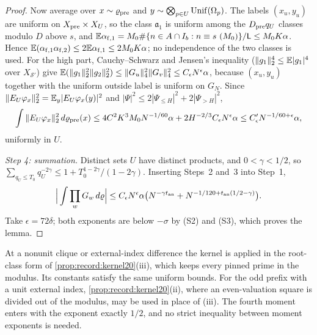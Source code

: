 \begin{proof}
Now average over $x\sim\varrho_{\rm pre}$ and
$y\sim\bigotimes_{p\in U}\operatorname{Unif}(\Omega_{p})$. The labels $(x_u,y_u)$ are uniform on
$X_{\rm pre}\times X_U$, so the class $\mathfrak a_1$ is uniform among the
$D_{\rm pre}q_U$ classes modulo $D$ above $s$, and
$\mathbb E\alpha_{{\rm f},1}=M_0\#\{n\in A\cap I_b:n\equiv s\ (M_0)\}/\mathsf L
\le M_0K\alpha$. Hence
$\mathbb E(\alpha_{{\rm f},1}\alpha_{{\rm f},2})\le2\mathbb E\alpha_{{\rm f},1}\le2M_0K\alpha$;
no independence of the two classes is used. For the high part,
Cauchy--Schwarz and Jensen's inequality ($\|g_1\|_2^4\le\mathbb E|g_1|^4$ over
$X_{\mathcal S'}$) give
$\mathbb E(\|g_1\|_2^2\|g_2\|_2^2)\le\|G_u\|_4^2\|G_v\|_4^2\le C_\epsilon N^\epsilon\alpha$,
because $(x_u,y_u)$ together with the uniform outside label is uniform on
$G_N$. Since $\|E_U\varphi_x\|_2^2=\mathbb E_y|E_U\varphi_x(y)|^2$ and
$|\Psi|^2\le2|\Psi_{\le H}|^2+2|\Psi_{>H}|^2$,
\[
 \int\|E_U\varphi_x\|_2^2\,d\varrho_{\rm pre}(x)\le4C^2K^3M_0 N^{-1/60}\alpha
 +2H^{-2/3}C_\epsilon N^\epsilon\alpha\le C'_\epsilon N^{-1/60+\epsilon}\alpha ,
\]
uniformly in $U$.

\emph{Step 4: summation.} Distinct sets $U$ have distinct products, and
$0<\gamma<1/2$, so
$\sum_{q_U\le T_0}q_U^{-2\gamma}\le1+T_0^{1-2\gamma}/(1-2\gamma)$. Inserting
Steps~2 and~3 into Step~1,
\[
 \Big|\int\prod_wG_w\,d\varrho\Big|\le C_\epsilon N^\epsilon\alpha
 \big(N^{-\gamma t_{\rm an}}+N^{-1/120+t_{\rm an}(1/2-\gamma)}\big).
\]
Take $\epsilon=72\delta$; both exponents are below $-\sigma$ by (S2) and
(S3), which proves the lemma.
\end{proof}

At a nonunit clique or external-index difference the kernel is applied in
the root-class form of \cref{prop:record:kernel20}(iii), which keeps every
pinned prime in the modulus. Its constants satisfy the same uniform bounds.
For the odd prefix with a unit external index,
\cref{prop:record:kernel20}(ii), where an even-valuation square is divided
out of the modulus, may be used in place of (iii). The fourth moment
enters with the exponent exactly $1/2$, and no strict inequality between
moment exponents is needed.

